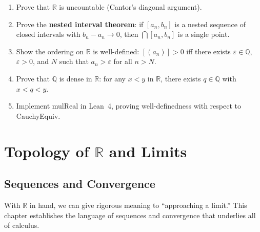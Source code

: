 \documentclass[12pt, openany]{book}
\theoremstyle{plain}
\theoremstyle{definition}
\theoremstyle{remark}
\newcommand{\Q}{\mathbb{Q}}
\newcommand{\R}{\mathbb{R}}
\newcommand{\eps}{\varepsilon}
\newcommand{\li}[1]{{\ttfamily\small\color{tealaccent}#1}}
\begin{document}
\begin{exbox}
\begin{enumerate}
  \item Prove that $\R$ is uncountable (Cantor's diagonal argument).
  \item Prove the \textbf{nested interval theorem}: if $[a_n, b_n]$ is a nested sequence of closed intervals with $b_n - a_n \to 0$, then $\bigcap [a_n, b_n]$ is a single point.
  \item Show the ordering on $\R$ is well-defined: $[(a_n)] > 0$ iff there exists $\eps \in \Q$, $\eps > 0$, and $N$ such that $a_n > \eps$ for all $n > N$.
  \item Prove that $\Q$ is dense in $\R$: for any $x < y$ in $\R$, there exists $q \in \Q$ with $x < q < y$.
  \item Implement \li{mulReal} in Lean~4, proving well-definedness with respect to \li{CauchyEquiv}.
\end{enumerate}
\end{exbox}
\color{black}

\part{Topology of \texorpdfstring{$\R$}{R} and Limits}
\color{black}

\chapter{Sequences and Convergence}
\color{black}

With $\R$ in hand, we can give rigorous meaning to ``approaching a limit.'' This chapter establishes the language of sequences and convergence that underlies all of calculus.
\end{document}
